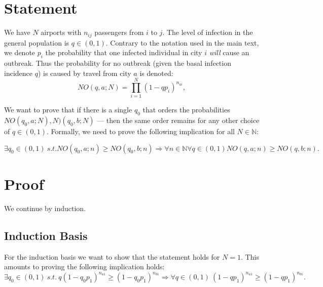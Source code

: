 \documentclass{amsproc}
\begin{document}
\section{Statement}
We have $N$ airports with $n_{ij}$ passengers from $i$ to $j$. The
level of infection in the general population is $q \in
(0,1)$. Contrary to the notation used in the main text, we denote
$p_i$ the probability that one infected individual in city $i$ {\it
  will} cause an outbreak. Thus the probability for no outbreak (given
the basal infection incidence $q$) is caused by travel from city $a$
is denoted:
$$
NO(q,a;N) = \prod_{i=1}^{N} (1 - qp_i)^{n_{ai}},
$$

We want to prove that if there is a single $q_0$ that orders the
probabilities $NO(q_0,a;N), N)(q_0,b;N)$ --- then the same order
remains for any other choice of $q \in (0,1)$. Formally, we need to
prove the following implication for all $N \in \mathbb{N}$:

$$
\exists q_0\in (0,1)\ s.t. NO(q_0,a;n) \geq NO(q_0,b;n) \Rightarrow \forall n\in \mathbb{N} \forall q \in (0,1) NO(q,a;n) \geq NO(q,b;n).
$$


\section{Proof}
We continue by induction.

\subsection{Induction Basis}
For the induction basis we want to show that the statement holds for
$N=1$. This amounts to proving the following implication holds:
$$
\exists q_0 \in (0,1)\ s.t.\ q(1-q_0p_1)^{n_{a1}} \geq (1-q_0p_1)^{n_{b1}} \Rightarrow  \forall q \in (0,1)\  (1-qp_1)^{n_{a1}} \geq (1-qp_1)^{n_{b1}}.
$$
\end{document}
